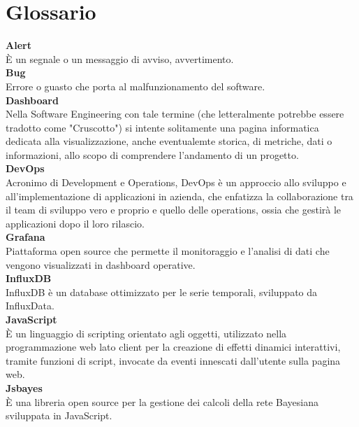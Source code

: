 \section{Glossario}\label{glox}

\textbf{Alert}\-\\
È un segnale o un messaggio di avviso, avvertimento. \-\\

\textbf{Bug}\-\\
Errore o guasto che porta al malfunzionamento del software.\-\\

\textbf{Dashboard} \-\\
Nella Software Engineering con tale termine (che letteralmente potrebbe essere tradotto come "Cruscotto") si intente solitamente una pagina informatica dedicata
alla visualizzazione, anche eventualemte storica, di metriche, dati o informazioni, allo scopo di comprendere l'andamento di un progetto.\-\\

\textbf{DevOps}\-\\
Acronimo di Development e Operations, DevOps è un approccio allo sviluppo e all’implementazione di applicazioni in azienda, che enfatizza la collaborazione tra il team di sviluppo vero e proprio e quello delle operations, ossia che gestirà le applicazioni dopo il loro rilascio. \-\\


\textbf{Grafana}\-\\
Piattaforma open source che permette il monitoraggio e l'analisi di dati che vengono visualizzati in dashboard operative.\-\\

\textbf{InfluxDB}\-\\
InfluxDB è un database ottimizzato per le serie temporali, sviluppato da InfluxData.\-\\

\textbf{JavaScript}\-\\
È un linguaggio di scripting orientato agli oggetti, utilizzato nella programmazione web lato client per la creazione di effetti dinamici interattivi, tramite funzioni di script, invocate da eventi innescati dall'utente sulla pagina web. \-\\

\textbf{Jsbayes}\-\\
È una libreria open source per la gestione dei calcoli della rete Bayesiana sviluppata in JavaScript.\-\\

